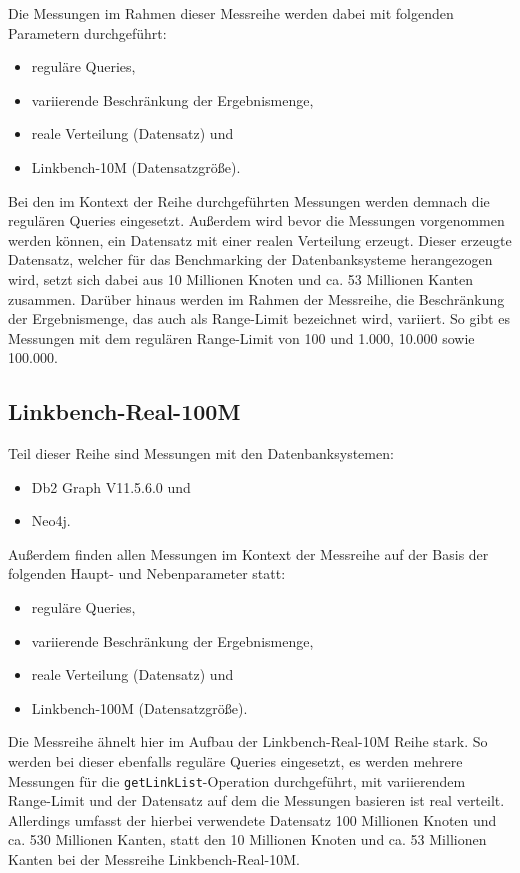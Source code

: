 Die Messungen im Rahmen dieser Messreihe werden dabei mit folgenden Parametern durchgeführt:
\begin{itemize}
    \item reguläre Queries,
    \item variierende Beschränkung der Ergebnismenge,
    \item reale Verteilung (Datensatz) und 
    \item Linkbench-10M (Datensatzgröße).
\end{itemize}
Bei den im Kontext der Reihe durchgeführten Messungen werden demnach die regulären Queries eingesetzt. Außerdem wird bevor die Messungen vorgenommen werden können, ein Datensatz mit einer realen Verteilung erzeugt. Dieser erzeugte Datensatz, welcher für das Benchmarking der Datenbanksysteme herangezogen wird, setzt sich dabei aus 10 Millionen Knoten und ca. 53 Millionen Kanten zusammen. Darüber hinaus werden im Rahmen der Messreihe, die Beschränkung der Ergebnismenge, das auch als Range-Limit bezeichnet wird, variiert. So gibt es Messungen mit dem regulären Range-Limit von 100 und 1.000, 10.000 sowie 100.000.

\subsection{Linkbench-Real-100M}
Teil dieser Reihe sind Messungen mit den Datenbanksystemen:
\begin{itemize}
    \item Db2 Graph V11.5.6.0 und 
    \item Neo4j. 
\end{itemize}

Außerdem finden allen Messungen im Kontext der Messreihe auf der Basis der folgenden Haupt- und Nebenparameter statt:
\begin{itemize}
    \item reguläre Queries,
    \item variierende Beschränkung der Ergebnismenge,
    \item reale Verteilung (Datensatz) und
    \item Linkbench-100M (Datensatzgröße).
\end{itemize}
Die Messreihe ähnelt hier im Aufbau der Linkbench-Real-10M Reihe stark. So werden bei dieser ebenfalls reguläre Queries eingesetzt, es werden mehrere Messungen für die \texttt{getLinkList}-Operation durchgeführt, mit variierendem Range-Limit und der Datensatz auf dem die Messungen basieren ist real verteilt. Allerdings umfasst der hierbei verwendete Datensatz 100 Millionen Knoten und ca. 530 Millionen Kanten, statt den 10 Millionen Knoten und ca. 53 Millionen Kanten bei der Messreihe Linkbench-Real-10M.



